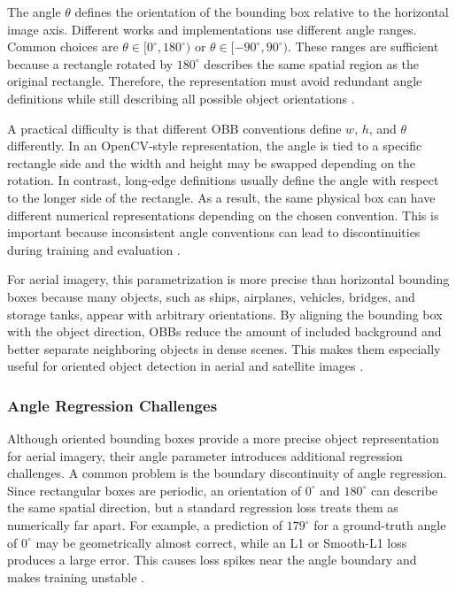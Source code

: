 The angle $\theta$ defines the orientation of the bounding box relative to the horizontal image axis. Different works and implementations use different angle ranges. Common choices are $\theta \in [0^\circ, 180^\circ)$ or $\theta \in [-90^\circ, 90^\circ)$. These ranges are sufficient because a rectangle rotated by $180^\circ$ describes the same spatial region as the original rectangle. Therefore, the representation must avoid redundant angle definitions while still describing all possible object orientations \cite{yang2022arbitrary,xie2021oriented}.

A practical difficulty is that different OBB conventions define $w$, $h$, and $\theta$ differently. In an OpenCV-style representation, the angle is tied to a specific rectangle side and the width and height may be swapped depending on the rotation. In contrast, long-edge definitions usually define the angle with respect to the longer side of the rectangle. As a result, the same physical box can have different numerical representations depending on the chosen convention. This is important because inconsistent angle conventions can lead to discontinuities during training and evaluation \cite{yang2022arbitrary}.

For aerial imagery, this parametrization is more precise than horizontal bounding boxes because many objects, such as ships, airplanes, vehicles, bridges, and storage tanks, appear with arbitrary orientations. By aligning the bounding box with the object direction, OBBs reduce the amount of included background and better separate neighboring objects in dense scenes. This makes them especially useful for oriented object detection in aerial and satellite images \cite{ding2021object,ding2018learning,xie2021oriented}.

\subsubsection{Angle Regression Challenges}

Although oriented bounding boxes provide a more precise object representation for aerial imagery, their angle parameter introduces additional regression challenges. A common problem is the boundary discontinuity of angle regression. Since rectangular boxes are periodic, an orientation of $0^\circ$ and $180^\circ$ can describe the same spatial direction, but a standard regression loss treats them as numerically far apart. For example, a prediction of $179^\circ$ for a ground-truth angle of $0^\circ$ may be geometrically almost correct, while an L1 or Smooth-L1 loss produces a large error. This causes loss spikes near the angle boundary and makes training unstable \cite{yang2022arbitrary}.

